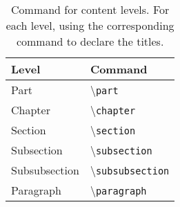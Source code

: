 \begin{table*}[t]
    \centering
    \begin{tabular}{ll}
        \toprule
        
        \textbf{Level} & \textbf{Command} \\

        \midrule

        Part & \textbackslash\texttt{part} \\
        Chapter & \textbackslash\texttt{chapter} \\
        Section & \textbackslash\texttt{section} \\
        Subsection & \textbackslash\texttt{subsection} \\
        Subsubsection & \textbackslash\texttt{subsubsection} \\
        Paragraph & \textbackslash\texttt{paragraph} \\

        \bottomrule
    \end{tabular}
    \caption[Command for content levels.]{Command for content levels. For each level, using the corresponding command to declare the titles.}
    \label{table.chapter1.command}
\end{table*}
